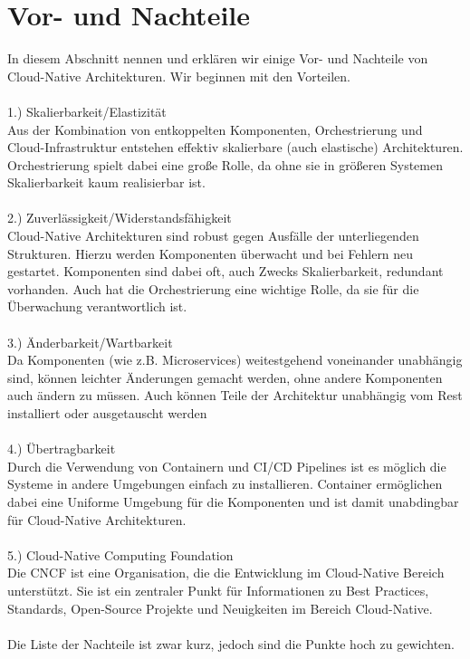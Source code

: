 \section{Vor- und Nachteile}
In diesem Abschnitt nennen und erklären wir einige Vor- und Nachteile von Cloud-Native Architekturen. Wir beginnen mit den Vorteilen.\\
\\
1.) Skalierbarkeit/Elastizität\\
Aus der Kombination von entkoppelten Komponenten, Orchestrierung und Cloud-Infrastruktur entstehen effektiv skalierbare (auch elastische) Architekturen. Orchestrierung spielt dabei eine große Rolle, da ohne sie in größeren Systemen Skalierbarkeit kaum realisierbar ist.\\
\\
2.) Zuverlässigkeit/Widerstandsfähigkeit\\
Cloud-Native Architekturen sind robust gegen Ausfälle der unterliegenden Strukturen. Hierzu werden Komponenten überwacht und bei Fehlern neu gestartet. Komponenten sind dabei oft, auch Zwecks Skalierbarkeit, redundant vorhanden. Auch hat die Orchestrierung eine wichtige Rolle, da sie für die Überwachung verantwortlich ist.\\
\\
3.) Änderbarkeit/Wartbarkeit\\
Da Komponenten (wie z.B. Microservices) weitestgehend voneinander unabhängig sind, können leichter Änderungen gemacht werden, ohne andere Komponenten auch ändern zu müssen. Auch können Teile der Architektur unabhängig vom Rest installiert oder ausgetauscht werden\\
\\
4.) Übertragbarkeit\\
Durch die Verwendung von Containern und CI/CD Pipelines ist es möglich die Systeme in andere Umgebungen einfach zu installieren. Container ermöglichen dabei eine Uniforme Umgebung für die Komponenten und ist damit unabdingbar für Cloud-Native Architekturen. \\
\\
5.) Cloud-Native Computing Foundation\\
Die CNCF ist eine Organisation, die die Entwicklung im Cloud-Native Bereich unterstützt. Sie ist ein zentraler Punkt für Informationen zu Best Practices, Standards, Open-Source Projekte und Neuigkeiten im Bereich Cloud-Native.\\
\\
Die Liste der Nachteile ist zwar kurz, jedoch sind die Punkte hoch zu gewichten.\\
